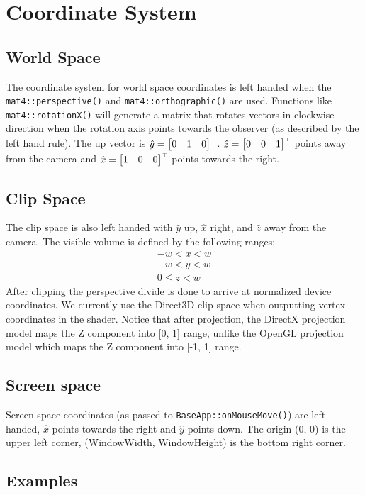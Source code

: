 \documentclass{article}
\renewcommand{\Vec}[1]{#1}
\newcommand{\BuildMat}[1]{\left[\begin{matrix}#1\end{matrix}\right]}
\newcommand{\transpose}{^{\mathstrut\scriptscriptstyle{\top}}}
\let\lstInline\lstinline %
\newcommand{\InlCode}[1]{\lstInline[basicstyle=\ttfamily]{#1}}
\begin{document}
\section{Coordinate System}
\subsection{World Space}
The coordinate system for world space coordinates is left handed when the \InlCode{mat4::perspective()} and \InlCode{mat4::orthographic()} are used.
Functions like \InlCode{mat4::rotationX()} will generate a matrix that rotates vectors in clockwise direction when the rotation axis points towards the observer (as described by the left hand rule).
The up vector is $\Vec{\hat y} = \BuildMat{0&1&0}\transpose$.
$\Vec{\hat z} = \BuildMat{0&0&1}\transpose$ points away from the camera and $\Vec{\hat x} = \BuildMat{1&0&0}\transpose$ points towards the right.

\subsection{Clip Space}
The clip space is also left handed with $\Vec{\hat y}$ up, $\Vec{\hat x}$ right, and $\Vec{\hat z}$ away from the camera.
The visible volume is defined by the following ranges:
\begin{align*}
-w<x<w\\
-w<y<w\\
0\leq z<w
\end{align*}
After clipping the perspective divide is done to arrive at normalized device coordinates. We currently use the Direct3D clip space when outputting vertex coordinates in the shader. Notice that after projection, the DirectX projection model maps the Z component into [0, 1] range, unlike the OpenGL projection model which maps the Z component into [-1, 1] range. 

\subsection{Screen space}
Screen space coordinates (as passed to \InlCode{BaseApp::onMouseMove()}) are left handed, $\Vec{\hat x}$ points towards the right and $\Vec{\hat y}$ points down. The origin (0, 0) is the upper left corner, (WindowWidth, WindowHeight) is the bottom right corner.


\subsection{Examples}
\end{document}
